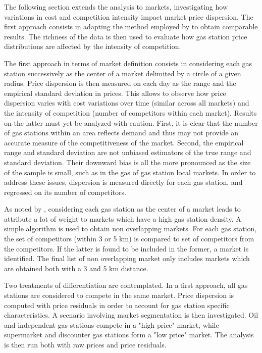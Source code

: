 \documentclass[english]{article}
\begin{document}
The following section extends the analysis to markets, investigating how variations in cost and competition intensity impact market price dispersion. The first approach consists in adapting the method employed by \cite{TAP11} to obtain comparable results. The richness of the data is then used to evaluate how gas station price distributions are affected by the intensity of competition.

The first approach in terms of market definition consists in considering each gas station successively as the center of a market delimited by a circle of a given radius. Price dispersion is then measured on each day as the range and the empirical standard deviation in prices. This allows to observe how price dispersion varies with cost variations over time (similar across all markets) and the intensity of competition (number of competitors within each market). Results on the latter must yet be analyzed with caution. First, it is clear that the number of gas stations within an area reflects demand and thus may not provide an accurate measure of the competitiveness of the market. Second, the empirical range and standard deviation are not unbiased estimators of the true range and standard deviation. Their downward bias is all the more pronounced as the size of the sample is small, such as in the gas of gas station local markets. In order to address these issues, dispersion is measured directly for each gas station, and regressed on its number of competitors.

As noted by \cite{TAP11}, considering each gas station as the center of a market leads to attribute a lot of weight to markets which have a high gas station density. A simple algorithm is used to obtain non overlapping markets.  For each gas station, the set of competitors (within 3 or 5 km) is compared to set of competitors from the competitors. If the latter is found to be included in the former, a market is identified. The final list of non overlapping market only includes markets which are obtained both with a 3 and 5 km distance.

Two treatments of differentiation are contemplated. In a first approach, all gas stations are considered to compete in the same market. Price dispersion is computed with price residuals in order to account for gas station specific characteristics. A scenario involving market segmentation is then investigated. Oil and independent gas stations compete in a "high price" market, while supermarket and discounter gas stations form a "low price" market. The analysis is then run both with raw prices and price residuals.
\end{document}
